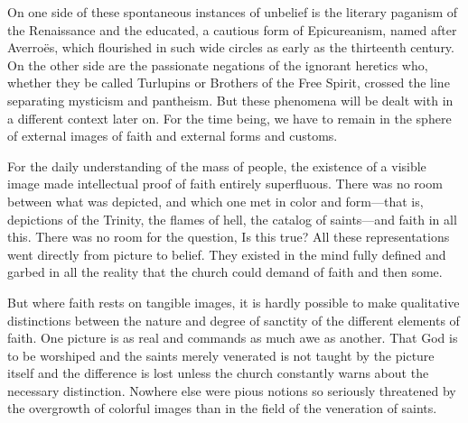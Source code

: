 On one side of these spontaneous instances of unbelief is the literary
paganism of the Renaissance and the educated, a cautious form of
Epicureanism, named after Averroës, which flourished in such wide
circles as early as the thirteenth century. On the other side are the
passionate negations of the ignorant heretics who, whether they be
called Turlupins or Brothers of the Free Spirit, crossed the line
separating mysticism and pantheism. But these phenomena will be dealt
with in a different context later on. For the time being, we have to
remain in the sphere of external images of faith and external forms and
customs.

For the daily understanding of the mass of people, the existence of a
visible image made intellectual proof of faith entirely superfluous.
There was no room between what was depicted, and which one met in color
and form---that is, depictions of the Trinity, the flames of hell, the
catalog of saints---and faith in all this. There was no room for the
question, Is this true? All these representations went directly from
picture to belief. They existed in the mind fully
\protect\hypertarget{13_Chapter_Six__THE_DEPICTION_OF_TH.xhtmlux5cux23page_190}{}{}defined
and garbed in all the reality that the church could demand of faith and
then some.

But where faith rests on tangible images, it is hardly possible to make
qualitative distinctions between the nature and degree of sanctity of
the different elements of faith. One picture is as real and commands as
much awe as another. That God is to be worshiped and the saints merely
venerated is not taught by the picture itself and the difference is lost
unless the church constantly warns about the necessary distinction.
Nowhere else were pious notions so seriously threatened by the
overgrowth of colorful images than in the field of the veneration of
saints.

